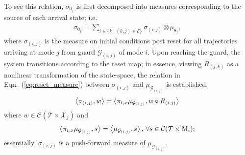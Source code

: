 \par
To see this relation, $\sigma_{0_j}$ is first decomposed into measures corresponding to the source of each arrival state; i.e.
\begin{align}
  \sigma_{0_j}=\sum_{i\in \{k\mid (k,j)\in \mathcal E\}} \sigma_{(i,j)}\otimes \mu_{\theta_j},
\end{align}
where $\sigma_{(i,j)}$ is the measure on initial conditions post reset for all trajectories arriving at mode $j$ from guard $\mathcal G_{(i,j)}$ of mode $i$. Upon reaching the guard, the system transitions according to the reset map; in essence, viewing $R_{(j,k)}$ as a nonlinear transformation of the state-space, the relation in Eqn.~(\ref{eq:reset_measure}) between $\sigma_{(i,j)}$ and $\mu_{\mathcal G_{(i,j)}}$ is established.
\begin{align}
    \left\langle \sigma_{(i,j)},w\right\rangle=\left\langle \pi_{t,x}\mu_{\mathcal G_{(i,j)}},w\circ R_{(i,j)}\right\rangle
    \label{eq:reset_measure}
\end{align}
where $w\in \mathcal C(\mathcal T\times \mathcal X_j)$ and
$$
  \left\langle \pi_{t,x}\mu_{\mathcal G_{(i,j)}},s\right\rangle=\left\langle \mu_{\mathcal G_{(i,j)}},s\right\rangle,\,\forall s\in \mathcal C(\mathcal T\times \mathrm M_i);
$$
essentially, $\sigma_{(i,j)}$ is a push-forward measure of $\mu_{\mathcal G_{(i,j)}}$.
